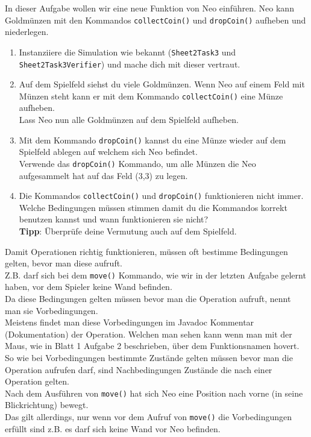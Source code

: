

In dieser Aufgabe wollen wir eine neue Funktion von Neo einführen. 
Neo kann Goldmünzen mit den Kommandos \lstinline{collectCoin()} und \lstinline{dropCoin()} aufheben und niederlegen. 

\begin{enumerate}
    \item Instanziiere die Simulation wie bekannt (\lstinline{Sheet2Task3} und \lstinline{Sheet2Task3Verifier}) und mache dich mit dieser vertraut.
    \item Auf dem Spielfeld siehst du viele Goldmünzen.
        Wenn Neo auf einem Feld mit Münzen steht kann er mit dem Kommando \lstinline{collectCoin()} eine Münze aufheben.\\
        Lass Neo nun alle Goldmünzen auf dem Spielfeld aufheben.
    \item Mit dem Kommando \lstinline{dropCoin()} kannst du eine Münze wieder auf dem Spielfeld ablegen auf welchem sich Neo befindet.\\
        Verwende das \lstinline{dropCoin()} Kommando, um alle Münzen die Neo aufgesammelt hat auf das Feld (3,3) zu legen.
    \item Die Kommandos \lstinline{collectCoin()} und \lstinline{dropCoin()} funktionieren nicht immer.
        Welche Bedingungen müssen stimmen damit du die Kommandos korrekt benutzen kannst und wann funktionieren sie nicht?\\
        \textbf{Tipp}: Überprüfe deine Vermutung auch auf dem Spielfeld.\\
\end{enumerate}


\begin{Infobox}
    Damit Operationen richtig funktionieren, müssen oft bestimme Bedingungen gelten, bevor man diese aufruft.\\
    Z.B. darf sich bei dem \lstinline{move()} Kommando, wie wir in der letzten Aufgabe gelernt haben, vor dem Spieler keine Wand befinden.\\
    Da diese Bedingungen gelten müssen bevor man die Operation aufruft, nennt man sie Vorbedingungen.\\
    Meistens findet man diese Vorbedingungen im Javadoc Kommentar (Dokumentation) der Operation. Welchen man sehen kann wenn man mit der Maus, wie in Blatt 1 Aufgabe 2 beschrieben, über dem Funktionsnamen hovert.\\

    So wie bei Vorbedingungen bestimmte Zustände gelten müssen bevor man die Operation aufrufen darf, sind Nachbedingungen Zustände die nach einer Operation gelten.\\
    Nach dem Ausführen von \lstinline{move()} hat sich Neo eine Position nach vorne (in seine Blickrichtung) bewegt.\\
    Das gilt allerdings, nur wenn vor dem Aufruf von \lstinline{move()} die Vorbedingungen erfüllt sind z.B. es darf sich keine Wand vor Neo befinden.\\


\end{Infobox}

